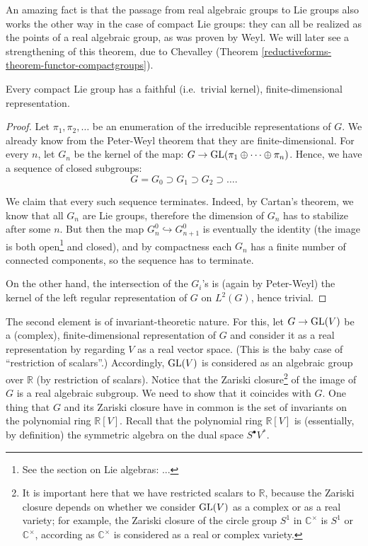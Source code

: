 An amazing fact is that the passage from real algebraic groups to Lie groups also works the other way in the case of compact Lie groups: they can all be realized as the points of a real algebraic group, as was proven by Weyl. We will later see a strengthening of this theorem, due to Chevalley (Theorem \ref{reductiveforms-theorem-functor-compactgroups}). 


\begin{proposition}
\label{proposition-compact-faithfulrep}
 Every compact Lie group has a faithful (i.e.\ trivial kernel), finite-dimensional representation.
\end{proposition}

\begin{proof}
 Let $\pi_1,\pi_2,\dots$ be an enumeration of the irreducible representations of $G$. We already know from the Peter-Weyl theorem that they are finite-dimensional. For every $n$, let $G_n$ be the kernel of the map: $G\to {\rm GL}(\pi_1\oplus\dots\oplus \pi_n)$. Hence, we have a sequence of closed subgroups:
$$ G=G_0\supset G_1\supset G_2\supset \dots.$$

We claim that every such sequence terminates. Indeed, by Cartan's theorem, we know that all $G_n$ are Lie groups, therefore the dimension of $G_n$ has to stabilize after some $n$. But then the map $G_n^0\hookrightarrow G_{n+1}^0$ is eventually the identity (the image is both open\footnote{See the section on Lie algebras: ...} and closed), and by compactness each $G_n$ has a finite number of connected components, so the sequence has to terminate.

On the other hand, the intersection of the $G_i$'s is (again by Peter-Weyl) the kernel of the left regular representation of $G$ on $L^2(G)$, hence trivial.
\end{proof}

The second element is of invariant-theoretic nature. For this, let $G\to {\rm GL}(V)$ be a (complex), finite-dimensional representation of $G$ and consider it as a real representation by regarding $V$ as a real vector space. (This is the baby case of ``restriction of scalars''.) Accordingly, ${\rm GL}(V)$ is considered as an algebraic group over $\mathbb R$ (by restriction of scalars). Notice that the Zariski closure\footnote{It is important here that we have restricted scalars to $\mathbb R$, because the Zariski closure depends on whether we consider ${\rm GL}(V)$ as a complex or as a real variety; for example, the Zariski closure of the circle group $S^1$ in $\mathbb C^\times$ is $S^1$ or $\mathbb C^\times$, according as $\mathbb C^\times$ is considered as a real or complex variety.} of the image of $G$ is a real algebraic subgroup. We need to show that it coincides with $G$. One thing that $G$ and its Zariski closure have in common is the set of invariants on the polynomial ring $\mathbb R[V]$. Recall that the polynomial ring $\mathbb R[V]$ is (essentially, by 
definition) the symmetric algebra on the dual space $S^\bullet V^*$.

